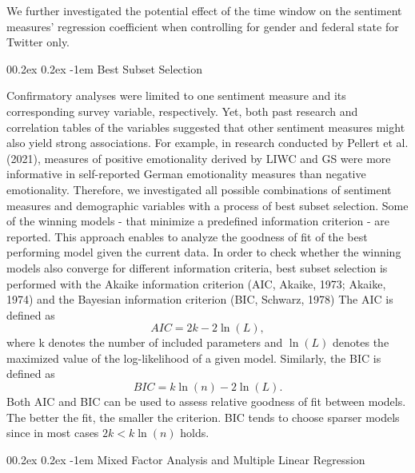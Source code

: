 \documentclass[
  english,
  jou,floatsintext]{apa7}
\makeatletter
\let\oldparagraph\paragraph
\renewcommand{\paragraph}[1]{\oldparagraph{#1}\mbox{}}
\renewcommand{\paragraph}{\@startsection{paragraph}{4}{\parindent}%
  {0\baselineskip \@plus 0.2ex \@minus 0.2ex}%
  {-1em}%
  {\normalfont\normalsize\bfseries\itshape\typesectitle}}
\makeatother
\begin{document}
We further investigated the potential effect of the time window on the sentiment measures' regression coefficient when controlling for gender and federal state for Twitter only.

\hypertarget{best-subset-selection}{%
\paragraph{Best Subset Selection}\label{best-subset-selection}}

Confirmatory analyses were limited to one sentiment measure and its corresponding survey variable, respectively. Yet, both past research and correlation tables of the variables suggested that other sentiment measures might also yield strong associations.
For example, in research conducted by Pellert et al. (2021), measures of positive emotionality derived by LIWC and GS were more informative in self-reported German emotionality measures than negative emotionality. Therefore, we investigated all possible combinations of sentiment measures and demographic variables with a process of best subset selection. Some of the winning models - that minimize a predefined information criterion - are reported. This approach enables to analyze the goodness of fit of the best performing model given the current data. In order to check whether the winning models also converge for different information criteria, best subset selection is performed with the Akaike information criterion (AIC, Akaike, 1973; Akaike, 1974) and the Bayesian information criterion (BIC, Schwarz, 1978) The AIC is defined as
\begin{equation}
AIC = 2k - 2 \ln (L), \label{eq:aic}
\end{equation}
where k denotes the number of included parameters and \(\ln(L)\) denotes the maximized value of the log-likelihood of a given model. Similarly, the BIC is defined as
\begin{equation}
BIC = k \ln(n) - 2 \ln (L). \label{eq:bic}
\end{equation}
Both AIC and BIC can be used to assess relative goodness of fit between models. The better the fit, the smaller the criterion. BIC tends to choose sparser models since in most cases \(2k < k \ln(n)\) holds.

\hypertarget{mixed-factor-analysis-and-multiple-linear-regression}{%
\paragraph{Mixed Factor Analysis and Multiple Linear Regression}\label{mixed-factor-analysis-and-multiple-linear-regression}}
\end{document}
